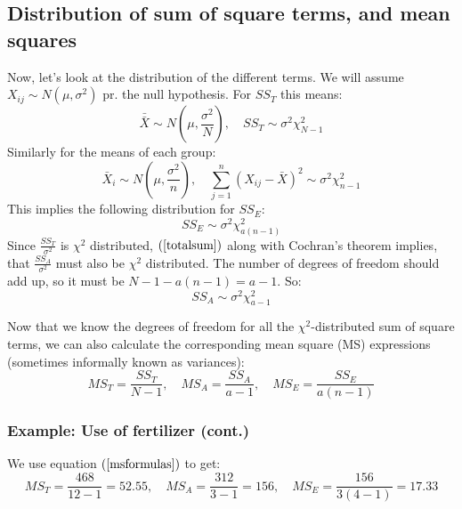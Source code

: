 \documentclass[12pt, a4paper]{article}
\newcommand*{\doublebar}[1]{\bar{\bar{#1}}}
\begin{document}
\subsection{Distribution of sum of square terms, and mean squares}
Now, let's look at the distribution of the different terms. We will assume $X_{ij}\sim N(\mu,\sigma^2)$ pr. the null hypothesis. For $SS_T$ this means:
\begin{equation}
\doublebar{X}\sim N\left(\mu,\frac{\sigma^2}{N}\right),\quad SS_T\sim\sigma^2\chi^2_{N-1}
\end{equation}
Similarly for the means of each group:
\begin{equation}
\bar{X}_i\sim N\left(\mu,\frac{\sigma^2}{n}\right),\quad\sum_{j=1}^n\left(X_{ij}-\bar{X}\right)^2\sim\sigma^2\chi^2_{n-1}
\end{equation}
This implies the following distribution for $SS_E$:
\begin{equation}
SS_E\sim\sigma^2\chi^2_{a(n-1)} 
\end{equation}
Since $\frac{SS_T}{\sigma^2}$ is $\chi^2$ distributed, $(\ref{totalsum})$ along with Cochran's theorem implies, that $\frac{SS_A}{\sigma^2}$ must also be $\chi^2$ distributed. The number of degrees of freedom should add up, so it must be $N-1-a(n-1)=a-1$. So:
\begin{equation}
SS_A\sim\sigma^2\chi^2_{a-1}
\end{equation}
\par
Now that we know the degrees of freedom for all the $\chi^2$-distributed sum of square terms, we can also calculate the corresponding mean square (MS) expressions (sometimes informally known as variances): 
\begin{equation}
\label{msformulas}
MS_T=\frac{SS_T}{N-1},\quad MS_A=\frac{SS_A}{a-1},\quad MS_E=\frac{SS_E}{a(n-1)}
\end{equation}

\subsubsection{Example: Use of fertilizer (cont.)}
We use equation $(\ref{msformulas})$ to get:
\begin{equation}
MS_T=\frac{468}{12-1}=52.55,\quad MS_A=\frac{312}{3-1}=156,\quad MS_E=\frac{156}{3(4-1)}=17.33
\end{equation}
\end{document}
